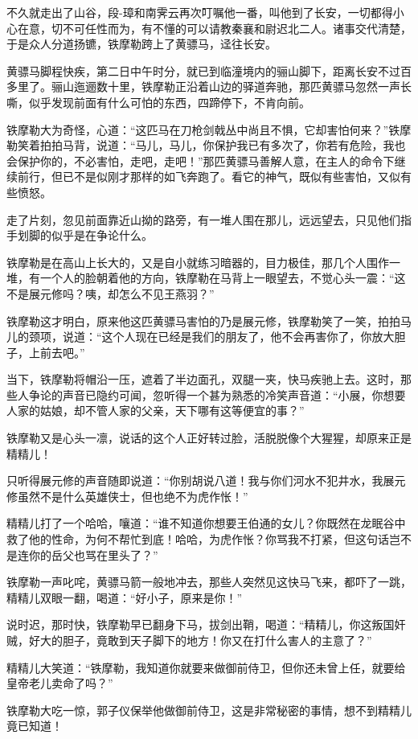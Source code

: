 \documentclass[12pt,oneside]{book}
\begin{document}
不久就走出了山谷，段-璋和南霁云再次叮嘱他一番，叫他到了长安，一切都得小心在意，切不可任性而为，有不懂的可以请教秦襄和尉迟北二人。诸事交代清楚，于是众人分道扬镳，铁摩勒跨上了黄骠马，迳往长安。

黄骠马脚程快疾，第二日中午时分，就已到临潼境内的骊山脚下，距离长安不过百多里了。骊山迤逦数十里，铁摩勒正沿着山边的驿道奔驰，那匹黄骠马忽然一声长嘶，似乎发现前面有什么可怕的东西，四蹄停下，不肯向前。

铁摩勒大为奇怪，心道：``这匹马在刀枪剑戟丛中尚且不惧，它却害怕何来？''铁摩勒笑着拍拍马背，说道：``马儿，马儿，你保护我已有多次了，你若有危险，我也会保护你的，不必害怕，走吧，走吧！''那匹黄骠马善解人意，在主人的命令下继续前行，但已不是似刚才那样的如飞奔跑了。看它的神气，既似有些害怕，又似有些愤怒。

走了片刻，忽见前面靠近山拗的路旁，有一堆人围在那儿，远远望去，只见他们指手划脚的似乎是在争论什么。

铁摩勒是在高山上长大的，又是自小就练习暗器的，目力极佳，那几个人围作一堆，有一个人的脸朝着他的方向，铁摩勒在马背上一眼望去，不觉心头一震：``这不是展元修吗？咦，却怎么不见王燕羽？''

铁摩勒这才明白，原来他这匹黄骠马害怕的乃是展元修，铁摩勒笑了一笑，拍拍马儿的颈项，说道：``这个人现在已经是我们的朋友了，他不会再害你了，你放大胆子，上前去吧。''

当下，铁摩勒将帽沿一压，遮着了半边面孔，双腿一夹，快马疾驰上去。这时，那些人争论的声音已隐约可闻，忽听得一个甚为熟悉的冷笑声音道：``小展，你想要人家的姑娘，却不管人家的父亲，天下哪有这等便宜的事？''

铁摩勒又是心头一凛，说话的这个人正好转过脸，活脱脱像个大猩猩，却原来正是精精儿！

只听得展元修的声音随即说道：``你别胡说八道！我与你们河水不犯井水，我展元修虽然不是什么英雄侠士，但也绝不为虎作怅！''

精精儿打了一个哈哈，嚷道：``谁不知道你想要王伯通的女儿？你既然在龙眠谷中救了他的性命，为何不帮忙到底！哈哈，为虎作怅？你骂我不打紧，但这句话岂不是连你的岳父也骂在里头了？''

铁摩勒一声叱咤，黄骠马箭一般地冲去，那些人突然见这快马飞来，都吓了一跳，精精儿双眼一翻，喝道：``好小子，原来是你！''

说时迟，那时快，铁摩勒早已翻身下马，拔剑出鞘，喝道：``精精儿，你这叛国奸贼，好大的胆子，竟敢到天子脚下的地方！你又在打什么害人的主意了？''

精精儿大笑道：``铁摩勒，我知道你就要来做御前侍卫，但你还未曾上任，就要给皇帝老儿卖命了吗？''

铁摩勒大吃一惊，郭子仪保举他做御前侍卫，这是非常秘密的事情，想不到精精儿竟已知道！
\end{document}

